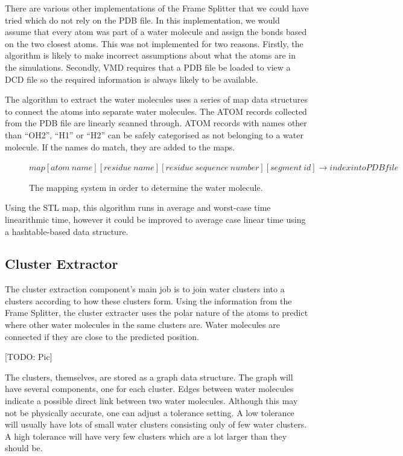 \documentclass[a4paper,11pt]{report}
\begin{document}
There are various other implementations of the Frame Splitter that we could have tried which do not rely on the PDB file. In this implementation, we would assume that every atom was part of a water molecule and assign the bonds based on the two closest atoms. This was not implemented for two reasons. Firstly, the algorithm is likely to make incorrect assumptions about what the atoms are in the simulations. Secondly, VMD requires that a PDB file be loaded to view a DCD file so the required information is always likely to be available.

The algorithm to extract the water molecules uses a series of map data structures to connect the atoms into separate water molecules. The ATOM records collected from the PDB file are linearly scanned through. ATOM records with names other than ``OH2'', ``H1'' or ``H2'' can be safely categorised as not belonging to a water molecule. If the names do match, they are added to the maps.

\begin{figure}[!h]
\begin{center}
 \small
 $map[atom\ name][residue\ name][residue\ sequence\ number][segment\ id] \rightarrow index into PDB file$
 \caption{The mapping system in order to determine the water molecule.}
\end{center} 
\end{figure}

Using the STL map, this algorithm runs in average and worst-case time linearithmic time, however it could be improved to average case linear time using a hashtable-based data structure.

\subsection{Cluster Extractor}

The cluster extraction component's main job is to join water clusters into a clusters according to how these clusters form. Using the information from the Frame Splitter, the cluster extracter uses the polar nature of the atoms to predict where other water molecules in the same clusters are. Water molecules are connected if they are close to the predicted position.

[TODO: Pic]

The clusters, themselves, are stored as a graph data structure. The graph will have several components, one for each cluster. Edges between water molecules indicate a possible direct link between two water molecules. Although this may not be physically accurate, one can adjust a tolerance setting. A low tolerance will usually have lots of small water clusters consisting only of few water clusters. A high tolerance will have very few clusters which are a lot larger than they should be.
\end{document}
